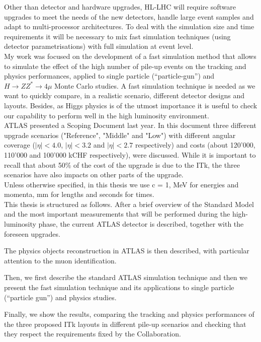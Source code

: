 \documentclass[a4paper,twoside,12pt]{book}
\begin{document}
Other than detector and hardware upgrades, HL-LHC will require software upgrades to meet the needs of the new detectors, handle large event samples and adapt to multi-processor
architectures. To deal with the simulation size and time requirements it will be necessary to mix fast simulation techniques (using detector parametrisations) with full simulation at event level.\\

My work was focused on the development of a fast simulation method that allows to simulate the effect of the high number of pile-up events on the tracking and physics performances, applied to single particle (``particle-gun'') and $H \rightarrow ZZ^{*} \rightarrow 4\mu$ Monte Carlo studies. A fast simulation technique is needed as we want to quickly compare, in a realistic scenario, different detector
designs and layouts. Besides, as Higgs physics is of the utmost importance it is useful to check our capability to perform well in the high luminosity environment.\\

ATLAS presented a Scoping Document\cite{scoping} last year. In this document three different upgrade scenarios ("Reference", "Middle" and "Low") with different angular coverage 
($|\eta| < 4.0$, $|\eta| < 3.2$ and $|\eta| < 2.7$ respectively) and costs (about 120'000, 110'000 and 100'000 kCHF respectively),  were discussed. While it is important to recall that about 50\% of the cost of the upgrade is due to the ITk, the three scenarios have
also impacts on other parts of the upgrade.\\

Unless otherwise specified, in this thesis we use c = 1, MeV for energies and momenta, mm for lengths and seconds for times. \\

This thesis is structured as follows. 
After a brief overview of the Standard Model and 
the most important measurements that will be performed during the high-luminosity phase,
the current ATLAS detector is described, together with the foreseen upgrades.

The physics objects reconstruction in ATLAS is then described, with particular attention to the
muon identification.

Then, we first describe the standard ATLAS simulation technique and then we present
the fast simulation technique and its applications to single particle (``particle gun'') and physics studies.

Finally, we show the results, comparing the tracking and physics performances of the three proposed ITk layouts
in different pile-up scenarios and checking that they respect the requirements fixed by the
Collaboration.
\end{document}
